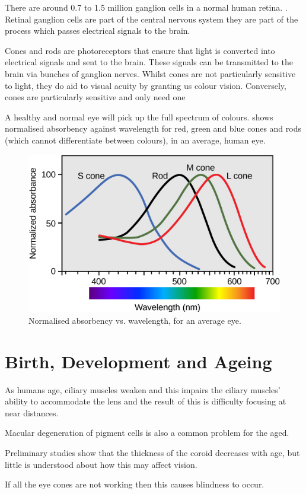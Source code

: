 There are around 0.7 to 1.5 million ganglion cells in a normal human retina.
\cite{curcio1990topography}. Retinal ganglion cells are part of the central
nervous system they are part of the process which passes electrical
signals to the brain.\cite{meyer1995characterization}

Cones and rods are photoreceptors that ensure that light is converted into
electrical signals  and sent to the brain. These signals can
be transmitted to the brain via bunches of ganglion nerves. Whilst cones
are not particularly sensitive to light, they do aid to visual acuity by
granting us colour vision.\cite{bowmaker1980visual} Conversely, cones are
particularly sensitive and only need one

A healthy and normal eye will pick up the full spectrum of colours.
 shows normalised absorbency against wavelength
for red, green and blue cones and rods (which cannot differentiate
between colours), in an average, human eye.

\begin{figure}[htbp]
  \centering
    \includegraphics{figures/wavelengths}
  \caption{Normalised absorbency vs. wavelength, for an average eye.}
  \label{fig:wavelengths}
\end{figure}

\section{Birth, Development and Ageing}

As humans age, ciliary muscles weaken and this impairs the ciliary
muscles' ability to accommodate the lens and the result of this is
difficulty focusing at near distances.\cite{fisher1985ciliary}

Macular degeneration of pigment cells  is
also a common problem for the aged.

Preliminary studies show that the thickness of the coroid decreases
with age, but little is understood about how this may affect vision.
\cite{margolis2009pilot}

If all the eye cones are not working then this causes blindness
to occur.\cite{}